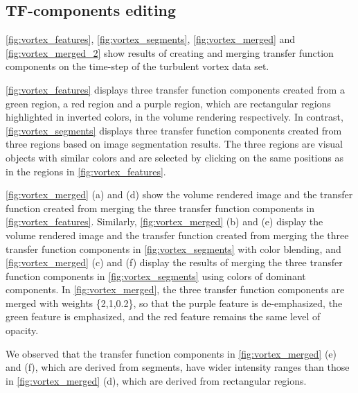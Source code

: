 \documentclass[twoside,twocolumn,10pt]{article}
\begin{document}

\subsection{TF-components editing}
\autoref{fig:vortex_features}, \autoref{fig:vortex_segments}, \autoref{fig:vortex_merged} and \autoref{fig:vortex_merged_2} show results of creating and merging transfer function components on the time-step of the turbulent vortex data set.

\autoref{fig:vortex_features} displays three transfer function components created from a green region, a red region and a purple region, which are rectangular regions highlighted in inverted colors, in the volume rendering respectively.
In contrast, \autoref{fig:vortex_segments} displays three transfer function components created from three regions based on image segmentation results. The three regions are visual objects with similar colors and are selected by clicking on the same positions as in the regions in \autoref{fig:vortex_features}.

\autoref{fig:vortex_merged} (a) and (d) show the volume rendered image and the transfer function created from merging the three transfer function components in \autoref{fig:vortex_features}.
Similarly, \autoref{fig:vortex_merged} (b) and (e) display the volume rendered image and the transfer function created from merging the three transfer function components in \autoref{fig:vortex_segments} with color blending, and \autoref{fig:vortex_merged} (c) and (f) display the results of merging the three transfer function components in \autoref{fig:vortex_segments} using colors of dominant components.
In \autoref{fig:vortex_merged}, the three transfer function components are merged with weights \{2,1,0.2\}, so that the purple feature is de-emphasized, the green feature is emphasized, and the red feature remains the same level of opacity.

We observed that the transfer function components in \autoref{fig:vortex_merged} (e) and (f), which are derived from segments, have wider intensity ranges than those in \autoref{fig:vortex_merged} (d), which are derived from rectangular regions.
\end{document}
